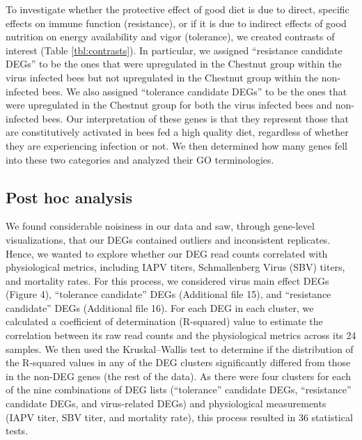 \documentclass{bmcart}
\begin{document}
\begin{linenumbers}
\begin{doublespacing}
To investigate whether the protective effect of good diet is due to direct, specific effects on immune function (resistance), or if it is due to indirect effects of good nutrition on energy availability and vigor (tolerance), we created contrasts of interest (Table \ref{tbl:contrasts}). In particular, we assigned ``resistance candidate DEGs'' to be the ones that were upregulated in the Chestnut group within the virus infected bees but not upregulated in the Chestnut group within the non-infected bees. We also assigned ``tolerance candidate DEGs'' to be the ones that were upregulated in the Chestnut group for both the virus infected bees and non-infected bees. Our interpretation of these genes is that they represent those that are constitutively activated in bees fed a high quality diet, regardless of whether they are experiencing infection or not. We then determined how many genes fell into these two categories and analyzed their GO terminologies.

\subsection*{Post hoc analysis}

We found considerable noisiness in our data and saw, through gene-level visualizations, that our DEGs contained outliers and inconsistent replicates. Hence, we wanted to explore whether our DEG read counts correlated with physiological metrics, including IAPV titers, Schmallenberg Virus (SBV) titers, and mortality rates. For this process, we considered virus main effect DEGs (Figure 4), ``tolerance candidate'' DEGs (Additional file 15), and ``resistance candidate'' DEGs (Additional file 16). For each DEG in each cluster, we calculated a coefficient of determination (R-squared) value to estimate the correlation between its raw read counts and the physiological metrics across its 24 samples. We then used the Kruskal–Wallis test to determine if the distribution of the R-squared values in any of the DEG clusters significantly differed from those in the non-DEG genes (the rest of the data). As there were four clusters for each of the nine combinations of DEG lists (``tolerance'' candidate DEGs, ``resistance'' candidate DEGs, and virus-related DEGs) and physiological measurements (IAPV titer, SBV titer, and mortality rate), this process resulted in 36 statistical tests.

\end{doublespacing} %



\end{linenumbers}
\end{document}
